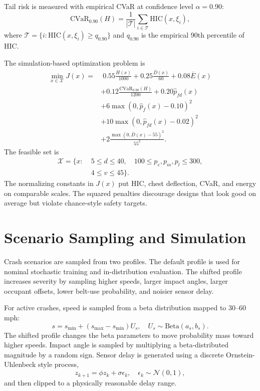 \documentclass[conference]{IEEEtran}
\begin{document}
Tail risk is measured with empirical CVaR at confidence level $\alpha=0.90$:
\begin{equation}
\mathrm{CVaR}_{0.90}(H)=
\frac{1}{|\mathcal{T}|}\sum_{i\in \mathcal{T}}\mathrm{HIC}(x,\xi_i),
\end{equation}
where $\mathcal{T}=\{i:\mathrm{HIC}(x,\xi_i)\geq q_{0.90}\}$ and $q_{0.90}$ is the empirical 90th percentile of HIC.

The simulation-based optimization problem is
\begin{align}
\min_{x\in\mathcal{X}} J(x)=
&\;0.55\frac{\overline{H}(x)}{1000}
+0.25\frac{\overline{D}(x)}{60}
+0.08\overline{E}(x) \nonumber\\
&+0.12\frac{\mathrm{CVaR}_{0.90}(H)}{1200}
+0.20\hat{p}_{fd}(x) \nonumber\\
&+6\max(0,\hat{p}_f(x)-0.10)^2 \nonumber\\
&+10\max(0,\hat{p}_{fd}(x)-0.02)^2 \nonumber\\
&+2\frac{\max(0,\overline{D}(x)-55)^2}{55^2}.
\end{align}
The feasible set is
\begin{align}
\mathcal{X}= \{x:\;&5\leq d\leq40,\quad
100\leq p_e,p_m,p_l\leq300,\nonumber\\
&4\leq v\leq45\}.
\end{align}
The normalizing constants in $J(x)$ put HIC, chest deflection, CVaR, and energy on comparable scales. The squared penalties discourage designs that look good on average but violate chance-style safety targets.

\section{Scenario Sampling and Simulation}
Crash scenarios are sampled from two profiles. The default profile is used for nominal stochastic training and in-distribution evaluation. The shifted profile increases severity by sampling higher speeds, larger impact angles, larger occupant offsets, lower belt-use probability, and noisier sensor delay.

For active crashes, speed is sampled from a beta distribution mapped to 30--60 mph:
\begin{equation}
s = s_{\min} + (s_{\max}-s_{\min})U_s,\quad U_s\sim \mathrm{Beta}(a_s,b_s).
\end{equation}
The shifted profile changes the beta parameters to move probability mass toward higher speeds. Impact angle is sampled by multiplying a beta-distributed magnitude by a random sign. Sensor delay is generated using a discrete Ornstein-Uhlenbeck style process,
\begin{equation}
z_{k+1}=\phi z_k+\sigma\epsilon_k,\quad \epsilon_k\sim\mathcal{N}(0,1),
\end{equation}
and then clipped to a physically reasonable delay range.
\end{document}

